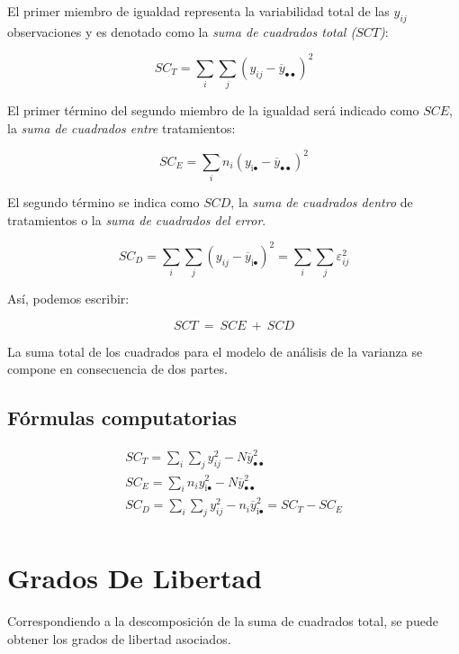 \documentclass[]{book}
\theoremstyle{definition}
\theoremstyle{definition}
\theoremstyle{definition}
\theoremstyle{remark}
\begin{document}
El primer miembro de igualdad representa la variabilidad total de las
\(y_{ij}\) observaciones y es denotado como la \emph{suma de cuadrados
total (}\(SCT\)\emph{)}:

\[
SC_T = \sum_{i}^{}{\sum_{j}^{}\left( y_{ij} - {\overline{y}}_{\bullet\bullet} \right)^{2}}
\]

El primer término del segundo miembro de la igualdad será indicado como
\(SCE\), la \emph{suma de cuadrados entre} tratamientos:

\[
SC_E = \sum_{i}^{}{n_{i}\left( y_{\text{i}\bullet} - {\overline{y}}_{\bullet\bullet} \right)^{2}}
\]

El segundo término se indica como \(SCD\), la \emph{suma de cuadrados
dentro} de tratamientos o la \emph{suma de cuadrados del error}.

\[
SC_D = \sum_{i}^{}{\sum_{j}^{}\left( y_{ij} - {\overline{y}}_{\text{i}\bullet} \right)^{2}} = \sum_{i}^{}{\sum_{j}^{}\varepsilon_{ij}^{2}}
\]

Así, podemos escribir:

\[
SCT\  = \ SCE\  + \ SCD
\]

La suma total de los cuadrados para el modelo de análisis de la varianza
se compone en consecuencia de dos partes.

\hypertarget{formulas-computatorias}{%
\subsection{Fórmulas computatorias}\label{formulas-computatorias}}

\[
\begin{matrix}
SC_T = \sum_{i}^{}{\sum_{j}^{}{y_{ij}^{2} - N{\overline{y}}_{\bullet\bullet}^{2}}} \\
SC_E = \sum_{i}^{}{n_{i}y_{\text{i}\bullet}^{2} - N{\overline{y}}_{\bullet\bullet}^{2}} \\
SC_D = \sum_{i}^{}{\sum_{j}^{}{y_{ij}^{2} - n_{i}{\overline{y}}_{\text{i}\bullet}^{2}}} = SC_T - SC_E \\
\end{matrix}
\]

\hypertarget{grados-de-libertad}{%
\section{Grados De Libertad}\label{grados-de-libertad}}

Correspondiendo a la descomposición de la suma de cuadrados total, se
puede obtener los grados de libertad asociados.
\end{document}
